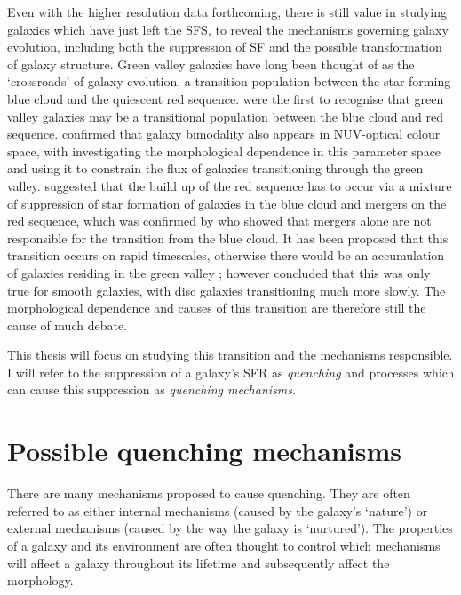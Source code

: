 Even with the higher resolution data forthcoming, there is still value in studying galaxies which have just left the SFS, to reveal the mechanisms governing galaxy evolution, including both the suppression of SF and the possible transformation of galaxy structure. Green valley galaxies have long been thought of as the `crossroads' of galaxy evolution, a transition population between the star forming blue cloud and the quiescent red sequence. \citet{Bell04} were the first to recognise that green valley galaxies may be a transitional population between the blue cloud and red sequence. \citet{Wyder07} confirmed that galaxy bimodality also appears in NUV-optical colour space, with \citet{Schim07} investigating the morphological dependence in this parameter space and \citet{Martin07} using it to constrain the flux of galaxies transitioning through the green valley. \citet{Faber07} suggested that the build up of the red sequence has to occur via a mixture of suppression of star formation of galaxies in the blue cloud and mergers on the red sequence, which was confirmed by \citet{Mendez11} who showed that mergers alone are not responsible for the transition from the blue cloud. {\minor It has been proposed that this transition occurs} on rapid timescales, otherwise there would be an accumulation of galaxies residing in the green valley \citep{Gonc12}; however \citet{schawinski14} concluded that this was only true for smooth galaxies, with disc galaxies transitioning much more slowly. The morphological dependence and causes of this transition are therefore still the cause of much debate. 


This thesis will focus on studying this transition and the mechanisms responsible. I will refer to the suppression of a galaxy's SFR as \emph{quenching} and processes which can cause this suppression as \emph{quenching mechanisms}. 

\section{Possible quenching mechanisms}\label{sec:quenchmech}

There are many mechanisms {\minor proposed to} cause quenching. They are often referred to as either internal mechanisms (caused by the galaxy's `nature') or external mechanisms (caused by the way the galaxy is `nurtured'). The properties of a galaxy and its environment are often thought to control which mechanisms will affect a galaxy throughout its lifetime and subsequently affect the morphology. 


